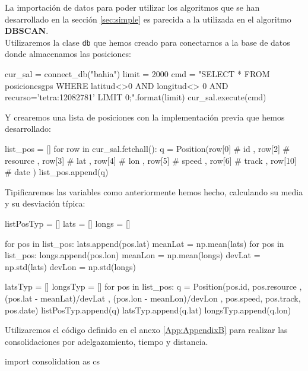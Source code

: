 \documentclass[a4paper, 12pt, spanish]{article}
\begin{document}
La importaci\'on de datos para poder utilizar los algoritmos que se han desarrollado en la secci\'on \ref{sec:simple} es parecida a la utilizada en el algoritmo \textbf{DBSCAN}.\\ 

Utilizaremos la clase \texttt{db} que hemos creado para conectarnos a la base de datos donde almacenamos las posiciones:\\

\begin{python}
cur_sal = connect_db("bahia")
limit = 2000
cmd = "SELECT * FROM posicionesgps WHERE latitud<>0 
			AND longitud<> 0 AND recurso='tetra:12082781' 
			LIMIT {0};".format(limit)
cur_sal.execute(cmd)
\end{python}

\bigskip
Y crearemos una lista de posiciones con la implementaci\'on previa que hemos desarrollado:\\

\begin{python}
list_pos = []
for row in cur_sal.fetchall():
	q = Position(row[0] # id
		, row[2] # resource
		, row[3] # lat
		, row[4] # lon
		, row[5] # speed
		, row[6] # track
		, row[10] # date
		)
	list_pos.append(q)
\end{python}

\smallskip
Tipificaremos las variables como anteriormente hemos hecho, calculando su media y su desviaci\'on t\'ipica:\\

\begin{python}
listPosTyp = []
lats = []
longs = []

for pos in list_pos:
    lats.append(pos.lat)
meanLat = np.mean(lats)
for pos in list_pos:
    longs.append(pos.lon)
meanLon = np.mean(longs)
devLat = np.std(lats)
devLon = np.std(longs)

latsTyp = []
longsTyp = []
for pos in list_pos:
	q = Position(pos.id, pos.resource
	, (pos.lat - meanLat)/devLat
	, (pos.lon - meanLon)/devLon
	, pos.speed, pos.track, pos.date)
	listPosTyp.append(q)
	latsTyp.append(q.lat)
	longsTyp.append(q.lon)
\end{python}

\bigskip
Utilizaremos el c\'odigo definido en el anexo \ref{App:AppendixB} para realizar las consolidaciones por adelgazamiento, tiempo y distancia.\\

\begin{python}
import consolidation as cs
\end{python}
\end{document}
